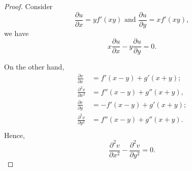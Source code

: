 \begin{Exercise}
\begin{proof}
Consider
$$
\frac{\partial u}{\partial x} = y f'(x y)\text{ and }\frac{\partial u}{\partial y} = x f'(x y),
$$
we have
$$
x\frac{\partial u}{\partial x} - y\frac{\partial u}{\partial y} = 0.
$$

On the other hand,
\begin{align*}
\frac{\partial v}{\partial x} &= f'(x-y)+g'(x+y); \\
\frac{\partial^2 v}{\partial x^2} &= f''(x-y)+g''(x+y), \\
\frac{\partial v}{\partial y} &= -f'(x-y)+g'(x+y); \\
\frac{\partial^2 v}{\partial y^2} &= f''(x-y)+g''(x+y). \\
\end{align*}
Hence,
$$
\frac{\partial^2 v}{\partial x^2} - \frac{\partial^2 v}{\partial y^2} = 0.
$$
\end{proof}
\end{Exercise}